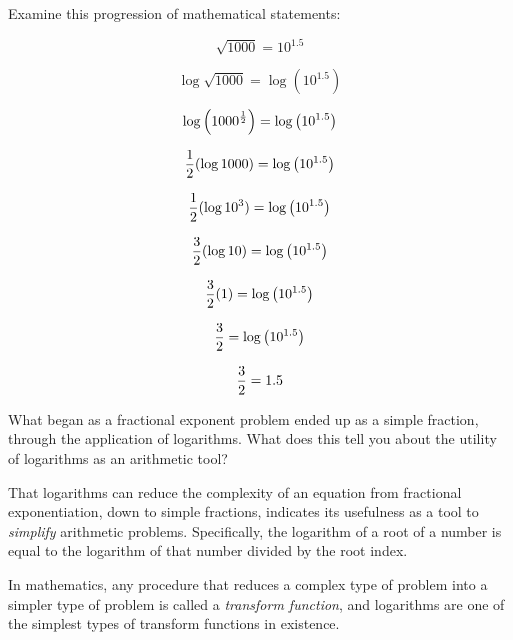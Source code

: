 

Examine this progression of mathematical statements:

$$\sqrt{1000} = 10^{1.5}$$

$$\log \sqrt{1000} = \log \left( 10^{1.5} \right)$$

$$\log \left( 1000^{1 \over 2} \right) = \log \left( 10^{1.5} \right)$$

$${1 \over 2}(\log 1000) = \log \left( 10^{1.5} \right)$$

$${1 \over 2}(\log 10^3) = \log \left( 10^{1.5} \right)$$

$${3 \over 2}(\log 10) = \log \left( 10^{1.5} \right)$$

$${3 \over 2}(1) = \log \left( 10^{1.5} \right)$$

$${3 \over 2} = \log \left( 10^{1.5} \right)$$

$${3 \over 2} = 1.5$$

What began as a fractional exponent problem ended up as a simple fraction, through the application of logarithms.  What does this tell you about the utility of logarithms as an arithmetic tool?







That logarithms can reduce the complexity of an equation from fractional exponentiation, down to simple fractions, indicates its usefulness as a tool to {\it simplify} arithmetic problems.  Specifically, the logarithm of a root of a number is equal to the logarithm of that number divided by the root index.







In mathematics, any procedure that reduces a complex type of problem into a simpler type of problem is called a {\it transform function}, and logarithms are one of the simplest types of transform functions in existence.




